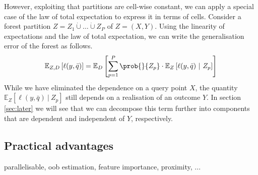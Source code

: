 \documentclass[../main.tex]{subfiles}
\begin{document}
However, exploiting that partitions are cell-wise constant, we can apply a special case of the law of total expectation to express it in terms of cells.
Consider a forest partition $Z = Z_{1} \dot\cup \dots \dot\cup Z_{P}$ of $Z=(X,Y)$. Using the linearity of expectations and the law of total expectation, we can write the generalisation error of the forest as follows. 
$$
\mathbb{E}_{Z,D}\left[ \ell(y,\bar{q}) \right] = \mathbb{E}_{D}\left[ \sum_{p=1}^P \prob{}{Z_{p}} \cdot \mathbb{E}_{Z}\left[ \ell(y, \bar{q}) ~|~Z_{p}\right]   \right] 
$$
While we have eliminated the dependence on a query point $X$, the quantity $\mathbb{E}_{Z}\left[ \ell(y, \bar{q}) ~|~Z_{p}\right]$ still depends on a realisation of an outcome $Y$. In section \ref{sec:later} we will see that we can decompose this term further into components that are dependent and independent of $Y$, respectively.

\subsection{Practical advantages}
parallelisable, oob estimation, feature importance, proximity, ...
\end{document}
